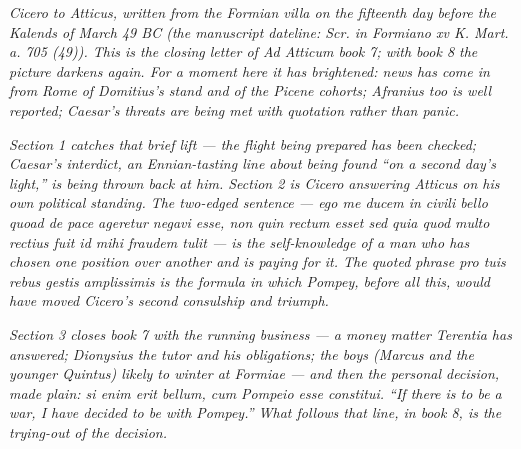 
\textit{Cicero to Atticus, written from the Formian
villa on the fifteenth day before the Kalends of March
49 BC (the manuscript dateline: \textit{Scr. in
Formiano xv K. Mart. a. 705 (49)}). This is the
closing letter of \textit{Ad Atticum} book 7; with book
8 the picture darkens again. For a moment here it has
brightened: news has come in from Rome of Domitius's
stand and of the Picene cohorts; Afranius too is well
reported; Caesar's threats are being met with quotation
rather than panic.}

\textit{Section 1 catches that brief lift --- the
flight being prepared has been checked; Caesar's
interdict, an Ennian-tasting line about being found
``on a second day's light,'' is being thrown back at
him. Section 2 is Cicero answering Atticus on his own
political standing. The two-edged sentence ---
\textit{ego me ducem in civili bello quoad de pace
ageretur negavi esse, non quin rectum esset sed quia
quod multo rectius fuit id mihi fraudem tulit} --- is
the self-knowledge of a man who has chosen one position
over another and is paying for it. The quoted phrase
\textit{pro tuis rebus gestis amplissimis} is the
formula in which Pompey, before all this, would have
moved Cicero's second consulship and triumph.}

\textit{Section 3 closes book 7 with the running
business --- a money matter Terentia has answered;
Dionysius the tutor and his obligations; the boys
(Marcus and the younger Quintus) likely to winter at
Formiae --- and then the personal decision, made
plain: \textit{si enim erit bellum, cum Pompeio esse
constitui}. ``If there is to be a war, I have decided
to be with Pompey.'' What follows that line, in book
8, is the trying-out of the decision.}
